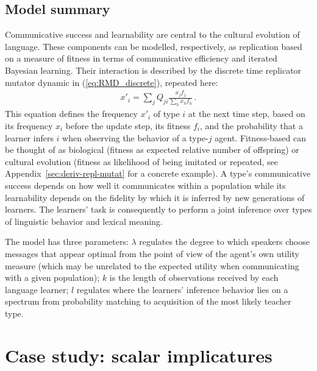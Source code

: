 \documentclass[a4paper, 11pt]{article}
\theoremstyle{Satz}
\begin{document}
\subsection{Model summary}

Communicative success and learnability are central to the cultural evolution of language. These
components can be modelled, respectively, as replication based on a measure of fitness in terms
of communicative efficiency and iterated Bayesian learning. Their interaction is described by
the discrete time replicator mutator dynamic in (\ref{eq:RMD_discrete}), repeated here:
\begin{align*}
  x'_i = \sum_j Q_{ji} \frac{x_jf_j}{\sum_h x_h f_h}\,.
\end{align*}
This equation defines the frequency $x'_i$ of type $i$ at the next time step, based on its
frequency $x_i$ before the update step, its fitness $f_i$, and the probability that a learner
infers $i$ when observing the behavior of a type-$j$ agent. Fitness-based can be thought of as
biological (fitness as expected relative number of offspring) or cultural evolution (fitness as
likelihood of being imitated or repeated, see Appendix~\ref{sec:deriv-repl-mutat} for a
concrete example). A type's communicative success depends on how well it communicates within a
population while its learnability depends on the fidelity by which it is inferred by new
generations of learners. The learners' task is consequently to perform a joint inference over
types of linguistic behavior and lexical meaning.

The model has three parameters: $\lambda$ regulates the degree to which speakers
choose messages that appear optimal from the point of view of the agent's own utility measure
(which may be unrelated to the expected utility when communicating with a given population);
$k$ is the length of observations received by each language learner; $l$ regulates where the learners'
inference behavior lies on a spectrum from probability matching to acquisition of the most likely
teacher type.





\section{Case study: scalar implicatures}
\label{sec:si-case-study}
\end{document}
